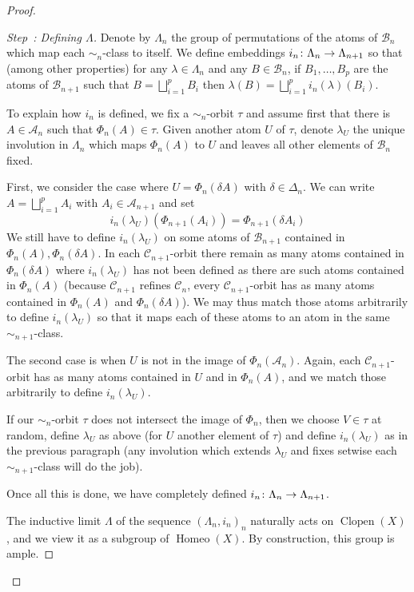 \documentclass[10pt,a4paper]{article}
\theoremstyle{definition}
\DeclareMathOperator{\Homeo}{Homeo}
\DeclareMathOperator{\Clopen}{Clopen}
\newcommand{\mcA}{\mathcal{A}}
\newcommand{\mcB}{\mathcal{B}}
\newcommand{\mcC}{\mathcal{C}}
\newcounter{setofstep}
\newcounter{step}[setofstep]
\newenvironment{step}[1][]{\refstepcounter{step}\begin{proof}[{Step~\thestep\if#1\empty\else: #1\fi}]}{\let\qed\relax\end{proof}}
\renewcommand*{\to}{\mathchoice{\longrightarrow}{\rightarrow}{\rightarrow}{\rightarrow}}
\begin{document}
\begin{proof}
\begin{step}[{Defining $\Lambda$}]
Denote by $\Lambda_n$ the group of permutations of the atoms of $\mcB_n$ which map each $\sim_n$-class to itself. We define embeddings $i_n \colon \Lambda_n \to \Lambda_{n+1}$ so that (among other properties) for any $\lambda \in \Lambda_n$ and any $B \in \mcB_n$, if $B_1,\dots,B_p$ are the atoms of $\mcB_{n+1}$ such that $B= \bigsqcup_{i=1}^p B_i$ then $\lambda (B)= \bigsqcup_{i=1}^p i_n(\lambda)(B_i)$.

To explain how $i_n$ is defined, we fix a $\sim_n$-orbit $\tau$ and assume first that there is $A \in \mcA_n$ such that $\Phi_n(A) \in \tau$. Given another atom $U$ of $\tau$, denote $\lambda_{U}$ the unique involution in $\Lambda_n$ which maps $\Phi_n(A)$ to $U$ and leaves all other elements of $\mcB_n$ fixed.

First, we consider the case where $U=\Phi_n(\delta A)$ with $\delta \in \Delta_n$. We can write $A=\bigsqcup_{i=1}^p A_i$ with $A_i \in \mcA_{n+1}$ and set
\[
i_n(\lambda_U)(\Phi_{n+1}(A_i))=\Phi_{n+1}(\delta A_i)
\]
We still have to define $i_n(\lambda_U)$ on some atoms of $\mcB_{n+1}$ contained in $\Phi_n(A),\Phi_n(\delta A)$. In each $\mcC_{n+1}$-orbit there remain as many atoms contained in $\Phi_n(\delta A)$ where $i_n(\lambda_U)$ has not been defined as there are such atoms contained in $\Phi_n(A)$ (because $\mcC_{n+1}$ refines $\mcC_n$, every $\mcC_{n+1}$-orbit has as many atoms contained in $\Phi_n(A)$ and $\Phi_n(\delta A)$). We may thus match those atoms arbitrarily to define $i_n(\lambda_U)$ so that it maps each of these atoms to an atom in the same $\sim_{n+1}$-class.

The second case is when $U$ is not in the image of $\Phi_n(\mcA_n)$. Again, each $\mcC_{n+1}$-orbit has as many atoms contained in $U$ and in $\Phi_n(A)$, and we match those arbitrarily to define $i_n(\lambda_U)$.

If our $\sim_n$-orbit $\tau$ does not intersect the image of $\Phi_n$, then we choose $V \in \tau$ at random, define $\lambda_U$ as above (for $U$ another element of $\tau$) and define $i_n(\lambda_U)$ as in the previous paragraph (any involution which extends $\lambda_U$ and fixes setwise each $\sim_{n+1}$-class will do the job).

Once all this is done, we have completely defined $i_n \colon \Lambda_n \to \Lambda_{n+1}$.

The inductive limit $\Lambda$ of the sequence $(\Lambda_n,i_n)_n$ naturally acts on $\Clopen(X)$, and we view it as a subgroup of $\Homeo(X)$. By construction, this group is ample.


\end{step}
\end{proof}
\end{document}
